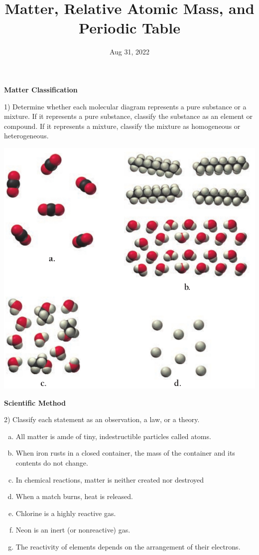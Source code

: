 \documentclass[12pt]{article}
\title{\textbf{Matter, Relative Atomic Mass, and Periodic Table}}
\date{Aug 31, 2022}
\begin{document}
\maketitle 

\textbf{Matter Classification}

1) Determine whether each molecular diagram represents a pure substance or a
mixture. If it represents a pure substance, classify the substance as an
element or compound. If it represents a mixture, classify the mixture as
homogeneous or heterogeneous.

\begin{center}
  \includegraphics[scale=0.25]{matter_classify}
\end{center}


\textbf{Scientific Method}

2) Classify each statement as an observation, a law, or a theory.
\vspace{0in}
\begin{enumerate}[a)]
\itemsep0em
\item All matter is amde of tiny, indestructible particles called
  atoms.
\item When iron rusts in a closed container, the mass of the container
  and its contents do not change.
\item In chemical reactions, matter is neither created nor destroyed
\item When a match burns, heat is released.
\item Chlorine is a highly reactive gas.
\item Neon is an inert (or nonreactive) gas.
\item The reactivity of elements depends on the arrangement of their
  electrons.
\end{enumerate}
\end{document}
